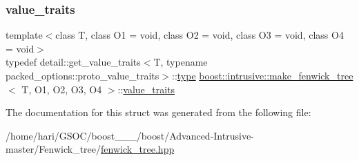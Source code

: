 \subsubsection{\texorpdfstring{value\+\_\+traits}{value\_traits}}
{\footnotesize\ttfamily template$<$class T, class O1 = void, class O2 = void, class O3 = void, class O4 = void$>$ \\
typedef detail\+::get\+\_\+value\+\_\+traits$<$T, typename packed\+\_\+options\+::proto\+\_\+value\+\_\+traits$>$\+::\hyperlink{structboost_1_1intrusive_1_1make__fenwick__tree_a174edb4a4fedde7b29f7aa9362d37ac0}{type} \hyperlink{structboost_1_1intrusive_1_1make__fenwick__tree}{boost\+::intrusive\+::make\+\_\+fenwick\+\_\+tree}$<$ T, O1, O2, O3, O4 $>$\+::\hyperlink{structboost_1_1intrusive_1_1make__fenwick__tree_a3ee00a7f2c43d65e29ad42d24f33235a}{value\+\_\+traits}}



The documentation for this struct was generated from the following file\+:\begin{DoxyCompactItemize}
\item 
/home/hari/\+G\+S\+O\+C/boost\+\_\+\_\+\_/boost/\+Advanced-\/\+Intrusive-\/master/\+Fenwick\+\_\+tree/\hyperlink{fenwick__tree_8hpp}{fenwick\+\_\+tree.\+hpp}\end{DoxyCompactItemize}
